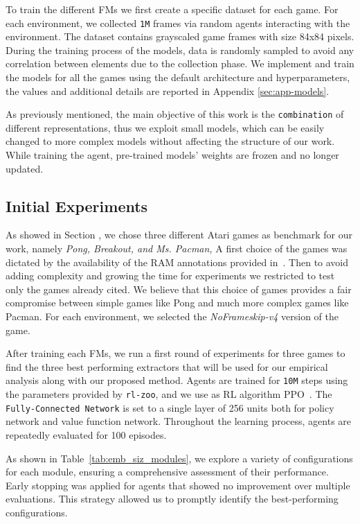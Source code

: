 To train the different FMs we first create a specific dataset for each game.
For each environment, we collected \texttt{1M} frames via random agents interacting with the environment.
The dataset contains grayscaled game frames with size 84x84 pixels.
During the training process of the models, data is randomly sampled to avoid any correlation between elements due to the collection phase.
We implement and train the models for all the games using the default architecture and hyperparameters, the values and additional details are reported in Appendix \ref{sec:app-models}.

As previously mentioned, the main objective of this work is the \texttt{combination} of different representations, thus we exploit small models, which can be easily changed to more complex models without affecting the structure of our work.
While training the agent, pre-trained models' weights are frozen and no longer updated.



\subsection{Initial Experiments}\label{sec:init_exp}
As showed in Section , we chose three different Atari games as benchmark for our work, namely \textit{Pong, Breakout, and Ms. Pacman,}
A first choice of the games was dictated by the availability of the RAM annotations provided in~\cite{anand2019unsupervised}.
Then to avoid adding complexity and growing the time for experiments we restricted to test only the games already cited.
We believe that this choice of games provides a fair compromise between simple games like Pong and much more complex games like Pacman.
For each environment, we selected the \textit{NoFrameskip-v4} version of the game.


After training each FMs, we run a first round of experiments for three games to find the three best performing extractors that will be used for our empirical analysis along with our proposed method.
Agents are trained for \texttt{10M} steps using the parameters provided by \texttt{rl-zoo}, and we use as RL algorithm PPO~\citep{schulman2017proximal}.
The \texttt{Fully-Connected Network} is set to a single layer of 256 units both for policy network and value function network.
Throughout the learning process, agents are repeatedly evaluated for 100 episodes.


As shown in Table~\ref{tab:emb_siz_modules}, we explore a variety of configurations for each module, ensuring a comprehensive assessment of their performance.
Early stopping was applied for agents that showed no improvement over multiple evaluations.
This strategy allowed us to promptly identify the best-performing configurations.

